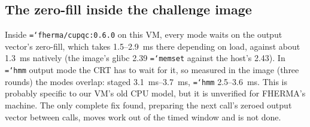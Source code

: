 \documentclass[11pt,a4paper]{article}
\newcommand{\code}[1]{\texttt{\hyphenchar\font=`\-\relax #1}}
\newcommand{\ms}[1]{\SI{#1}{\milli\second}}
\begin{document}
\subsection{The zero-fill inside the challenge image}
Inside \code{fherma/cupqc:0.6.0} on this VM, every mode waits on the output vector's
zero-fill, which takes 1.5--\ms{2.9} there depending on load, against about \ms{1.3}
natively (the image's glibc 2.39 \code{memset} against the host's 2.43). In \code{hmm}
output mode the CRT has to wait for it, so measured in the image (three rounds) the modes
overlap: staged \ms{3.1}--\ms{3.7}, \code{hmm} 2.5--\ms{3.6}. This is probably specific to
our VM's old CPU model, but it is unverified for FHERMA's machine. The only complete fix
found, preparing the next call's zeroed output vector between calls, moves work out of the
timed window and is not done.
\end{document}
